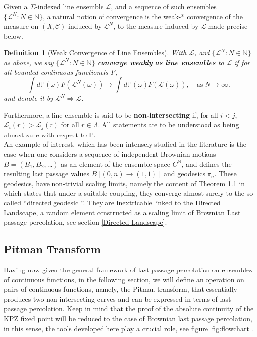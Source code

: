 \documentclass[12pt]{report}
\theoremstyle{plain}
\newtheorem{definition}{Definition}[section]
\newcommand{\N}{\ensuremath{\mathbb{N}}}
\newcommand{\PP}{\ensuremath{\mathbb{P}}}
\begin{document}
Given a $\Sigma$-indexed line ensemble $\mathcal{L}$, and a sequence of such ensembles $\big\{ \mathcal{L}^N: N \in \N \big\}$,  a natural notion of convergence is the weak-* convergence of the measure on $(X,\mathcal{C})$ induced by $\mathcal{L}^N$, to the measure induced by $\mathcal{L}$ made precise below.

\begin{definition}[Weak Convergence of Line Ensembles]\label{def: convergence in law}
    With $\mathcal{L}$, and $\big\{ \mathcal{L}^N: N \in \N \big\}$ as above, we say $\big\{ \mathcal{L}^N: N \in \N \big\}$ \textbf{converge weakly as line ensembles} to $\mathcal{L}$ if for all bounded continuous functionals $F$, 
    \[
    \int d\PP(\omega) F(\mathcal{L}^{N}(\omega)) \to \int d\PP(\omega) F(\mathcal{L}(\omega)), \quad \text{as } N\to \infty.
    \]
    and denote it by $\mathcal{L}^N\Rightarrow \mathcal{L}$.
\end{definition}

Furthermore, a line ensemble is said to be \textbf{non-intersecting} if, for all $i<j$, $\mathcal{L}_i(r)>\mathcal{L}_j(r)$ for all $r\in \Lambda$. All statements are to be understood as being almost sure with respect to $\PP$.\\

An example of interest, which has been intensely studied in the literature is the case when one considers a sequence of independent Brownian motions \(B = (B_1, B_2, \dots)\) as an element of the ensemble space \(C^{\mathbb{N}}\), and defines the resulting last passage values \(B[(0,n) \to (1,1)]\) and geodesics \(\pi_n\). These geodesics, have non-trivial scaling limits, namely the content of Theorem 1.1 in \cite{DOV} which states that under a suitable coupling, they converge almost surely to the so called \textquotedblleft directed geodesic \textquotedblright. They are inextricable linked to the Directed Landscape, a random element constructed as a scaling limit of Brownian Last passage percolation, see section \ref{Directed Landscape}. 

\subsection{Pitman Transform}

\indent Having now given the general framework of last passage percolation on ensembles of continuous functions, in the following section, we will define an operation on pairs of continuous functions, namely, the Pitman transform, that essentially produces two non-intersecting curves and can be expressed in terms of last passage percolation. Keep in mind that the proof of the absolute continuity of the KPZ fixed point will be reduced to the case of Brownian last passage percolation, in this sense, the tools developed here play a crucial role, see figure \ref{fig:flowchart}.\\
\end{document}
